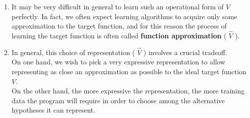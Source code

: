 \begin{enumerate}
    \item It may be very difficult in general to learn such an operational form of $V$ perfectly. In fact, we often expect learning algorithms to acquire only some approximation to the target function, and for this reason the process of learning the target function is often called \textbf{function approximation} ( $\hat{V}$ ).
    \hfill \cite{ml/book/Machine-Learning/Tom-M-Mitchell}

    \item In general, this choice of representation ( $\hat{V}$ ) involves a crucial tradeoff.
    \\
    On one hand, we wish to pick a very expressive representation to allow representing as close an approximation as possible to the ideal target function $V$.
    \\
    On the other hand, the more expressive the representation, the more training data the program will require in order to choose among the alternative hypotheses it can represent.
    \hfill \cite{ml/book/Machine-Learning/Tom-M-Mitchell}




\end{enumerate}
